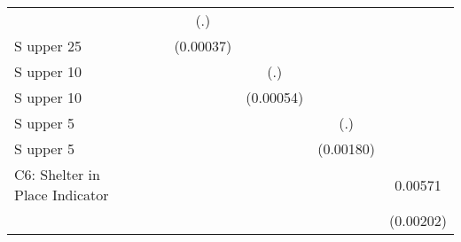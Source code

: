 \begin{table}[htbp]
\begin{tabular}{l*{6}{c}}
                    &                     &                     &         (.)         &                     &                     &                     \\
\addlinespace
S upper 25%
                    &                     &                     &   (0.00037)         &                     &                     &                     \\
\addlinespace
S upper 10%
                    &                     &                     &                     &         (.)         &                     &                     \\
\addlinespace
S upper 10%
                    &                     &                     &                     &   (0.00054)         &                     &                     \\
\addlinespace
S upper 5%
                    &                     &                     &                     &                     &         (.)         &                     \\
\addlinespace
S upper 5%
                    &                     &                     &                     &                     &   (0.00180)         &                     \\
\addlinespace
C6: Shelter in Place Indicator&                     &                     &                     &                     &                     &     0.00571\sym{***}\\
                    &                     &                     &                     &                     &                     &   (0.00202)         \\

\end{tabular}
\end{table}
